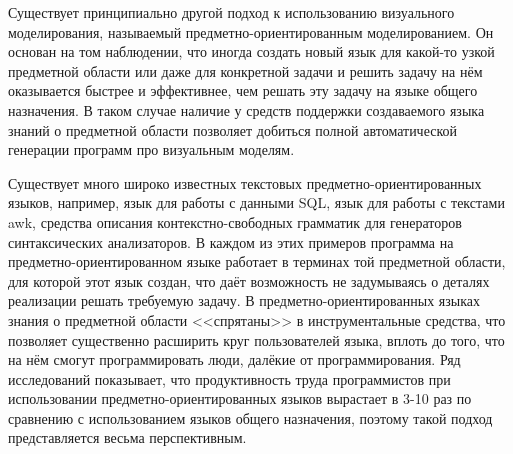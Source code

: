 Существует принципиально другой подход к использованию визуального 
моделирования, называемый предметно-ориентированным моделированием. Он основан на том наблюдении, что иногда создать новый 
язык для какой-то узкой предметной области или даже для конкретной задачи и решить задачу 
на нём оказывается быстрее и эффективнее, чем решать эту задачу на языке общего назначения. 
В таком случае наличие у средств поддержки создаваемого языка знаний о предметной области 
позволяет добиться полной автоматической генерации программ про визуальным моделям.

Существует много широко известных текстовых предметно-ориентированных языков, 
например, язык для работы с данными SQL, язык для работы с текстами awk,
средства описания контекстно-свободных грамматик для генераторов синтаксических 
анализаторов. В каждом из этих примеров программа на предметно-ориентированном 
языке работает в терминах той предметной области, для которой этот язык создан,
что даёт возможность не задумываясь о деталях реализации решать требуемую 
задачу. В предметно-ориентированных языках знания о предметной области <<спрятаны>>
в инструментальные средства, что позволяет существенно расширить круг пользователей языка, 
вплоть до того, что на нём смогут программировать люди, далёкие от программирования. Ряд исследований
показывает, что продуктивность труда программистов при использовании 
предметно-ориентированных языков вырастает в 3-10 раз по сравнению с 
использованием языков общего назначения, поэтому такой подход представляется 
весьма перспективным.

